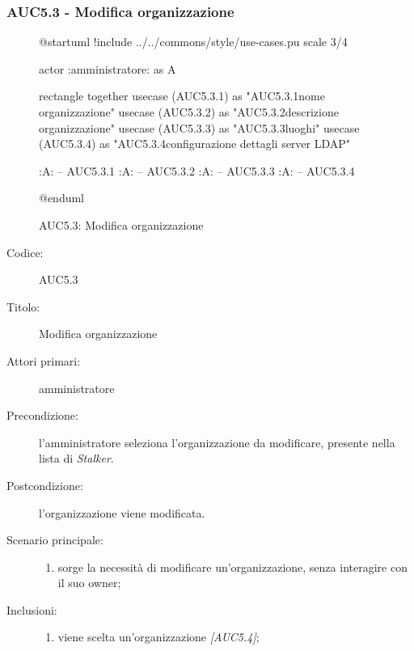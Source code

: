 \documentclass[../../../analisi-dei-requisiti.tex]{subfiles}
\begin{document}
\subsubsection{AUC5.3 - Modifica organizzazione}%
\label{subsub:AUC5.3}

\begin{figure}[h!]
  \centering
  \begin{plantuml}
  @startuml
  !include ../../commons/style/use-cases.pu
  scale 3/4

  actor :amministratore: as A

  rectangle {
    together {
      usecase (AUC5.3.1) as "AUC5.3.1\nModifica nome organizzazione"
      usecase (AUC5.3.2) as "AUC5.3.2\nModifica descrizione organizzazione"
      usecase (AUC5.3.3) as "AUC5.3.3\nGestione luoghi"
      usecase (AUC5.3.4) as "AUC5.3.4\nModifica configurazione dettagli server LDAP"
    }
  }

  :A: -- AUC5.3.1
  :A: -- AUC5.3.2
  :A: -- AUC5.3.3
  :A: -- AUC5.3.4

  @enduml
  \end{plantuml}
  \caption{AUC5.3: Modifica organizzazione}
  \label{fig:AUC5_3}
\end{figure}

\begin{description}
  \item[Codice:] AUC5.3
  \item[Titolo:] Modifica organizzazione
  \item[Attori primari:] amministratore
  \item[Precondizione:] l'amministratore seleziona l'organizzazione da modificare, presente nella lista di \emph{Stalker}.
  \item[Postcondizione:] l'organizzazione viene modificata.
  \item[Scenario principale:]
  \begin{enumerate}
    \item sorge la necessità di modificare un'organizzazione, senza interagire con il suo owner;
  \end{enumerate}
  \item[Inclusioni:]
  \begin{enumerate}
    \item viene scelta un'organizzazione \emph{[AUC5.4]};
  \end{enumerate}
\end{description}
\end{document}
